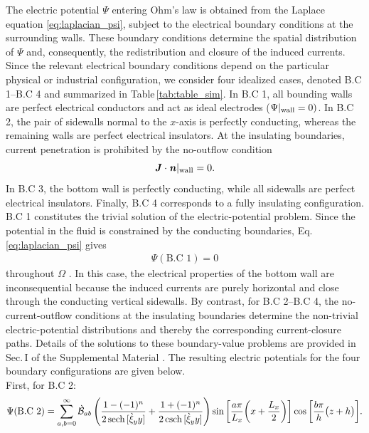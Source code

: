 \documentclass[aps,prfluids,reprint,superscriptaddress]{revtex4-2}
\newcommand{\h}[1]{\textbf{\textit{#1}}}
\newcommand{\ii}[1]{\text{#1}}
\begin{document}
The electric potential $\Psi$ entering Ohm's law is obtained from the Laplace equation \eqref{eq:laplacian_psi}, subject to the electrical boundary conditions at the surrounding walls. These boundary conditions determine the spatial distribution of $\Psi$ and, consequently, the redistribution and closure of the induced currents. Since the relevant electrical boundary conditions depend on the particular physical or industrial configuration, we consider four idealized cases, denoted B.C 1--B.C 4 and summarized in Table\,\ref{tab:table_sim}. In B.C 1, all bounding walls are perfect electrical conductors and act as ideal electrodes ($\Psi|_{\rm wall}=0)$.
In B.C 2, the pair of sidewalls normal to the $x$-axis is perfectly conducting, whereas the remaining walls are perfect electrical insulators. At the insulating boundaries, current penetration is prohibited by the no-outflow condition
\begin{equation}
	\h J\cdot\h n|_{\rm wall}=0.
\end{equation}
In B.C 3, the bottom wall is perfectly conducting, while all sidewalls are perfect electrical insulators. Finally, B.C 4 corresponds to a fully insulating configuration. B.C 1 constitutes the trivial solution of the electric-potential problem. Since the potential in the fluid is constrained by the conducting boundaries, Eq.\,\eqref{eq:laplacian_psi} gives 
\begin{align}
\Psi(\ii{B.C 1})=0
\end{align}
throughout $\Omega$ \cite{Sreenivasan2005}. In this case, the electrical properties of the bottom wall are inconsequential because the induced currents are purely horizontal and close through the conducting vertical sidewalls. By contrast, for B.C 2--B.C 4, the no-current-outflow conditions at the insulating boundaries determine the non-trivial electric-potential distributions and thereby the corresponding current-closure paths.
Details of the solutions to these boundary-value problems are provided in Sec.\,I of the Supplemental Material \cite{SMmagdamp_hegde}. The resulting electric potentials for the four boundary configurations are given below. 
\\
\indent First, for B.C 2:
\begin{gather}
	\Psi (\ii{B.C 2})= 
	\sum_{a,b=0}^{\infty}
	\grave{\mathcal{B}}_{ab} 
	\left(
	\frac{1-(-1)^n}{2\sech{[\grave\xi_y y]}} + \frac{1+(-1)^n}{2\csch{[\grave\xi_y y]}}
	\right)
	\sin{\biggl[ \frac{a\pi}{L_x}\biggl(x + \frac{L_x}{2}\biggr)\biggr]}
	\cos{\biggl[ \frac{b\pi}{h}\bigl(z + h\bigr)\biggr]}
	.
	\label{eq:bc2_potential_old}
\end{gather}
\end{document}
